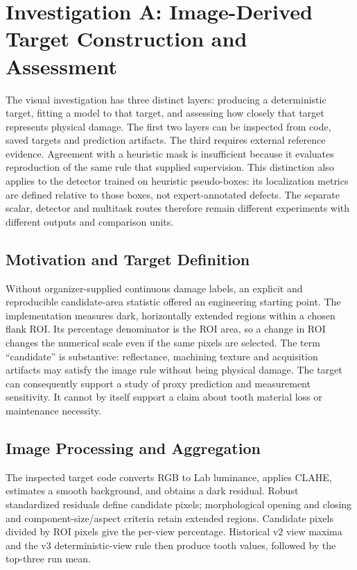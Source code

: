 \section{Investigation A: Image-Derived Target Construction and Assessment}
The visual investigation has three distinct layers: producing a deterministic target,
fitting a model to that target, and assessing how closely that target represents
physical damage. The first two layers can be inspected from code, saved targets and
prediction artifacts. The third requires external reference evidence. Agreement with a
heuristic mask is insufficient because it evaluates reproduction of the same rule that
supplied supervision. This distinction also applies to the detector trained on heuristic
pseudo-boxes: its localization metrics are defined relative to those boxes, not
expert-annotated defects. The separate scalar, detector and multitask routes therefore
remain different experiments with different outputs and comparison units.

\subsection{Motivation and Target Definition}
Without organizer-supplied continuous damage labels, an explicit and reproducible
candidate-area statistic offered an engineering starting point. The implementation
measures dark, horizontally extended regions within a chosen flank ROI. Its percentage
denominator is the ROI area, so a change in ROI changes the numerical scale even if the
same pixels are selected. The term ``candidate'' is substantive: reflectance, machining
texture and acquisition artifacts may satisfy the image rule without being physical
damage. The target can consequently support a study of proxy prediction and measurement
sensitivity. It cannot by itself support a claim about tooth material loss or
maintenance necessity.

\subsection{Image Processing and Aggregation}
The inspected target code converts RGB to Lab luminance, applies CLAHE, estimates a
smooth background, and obtains a dark residual. Robust standardized residuals define
candidate pixels; morphological opening and closing and component-size/aspect criteria
retain extended regions. Candidate pixels divided by ROI pixels give the per-view
percentage. Historical v2 view maxima and the v3 deterministic-view rule then produce
tooth values, followed by the top-three run mean.


